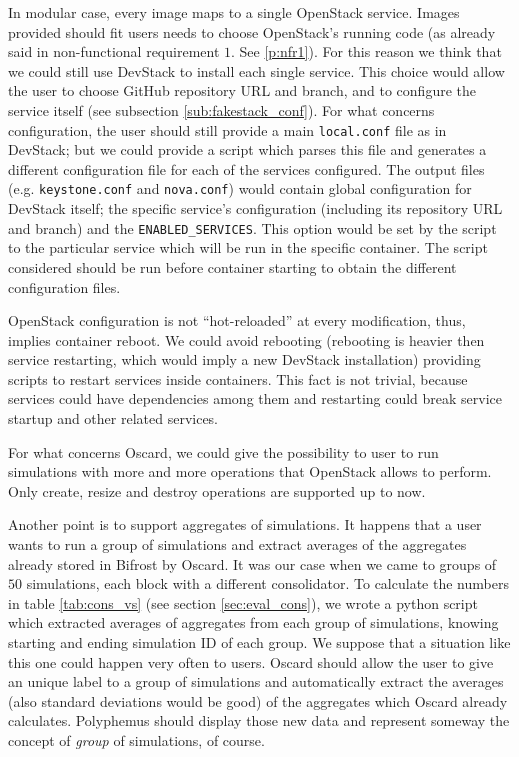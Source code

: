 In modular case, every image maps to a single OpenStack service. Images provided should fit users needs to choose OpenStack's running code (as already said in non-functional requirement $1$. See \ref{p:nfr1}). For this reason we think that we could still use DevStack to install each single service. This choice would allow the user to choose GitHub repository URL and branch, and to configure the service itself (see subsection \ref{sub:fakestack_conf}). For what concerns configuration, the user should still provide a main \texttt{local.conf} file as in DevStack; but we could provide a script which parses this file and generates a different configuration file for each of the services configured. The output files (e.g. \texttt{keystone.conf} and \texttt{nova.conf}) would contain global configuration for DevStack itself; the specific service's configuration (including its repository URL and branch) and the \texttt{ENABLED\_SERVICES}. This option would be set by the script to the particular service which will be run in the specific container. The script considered should be run before container starting to obtain the different configuration files.

OpenStack configuration is not ``hot-reloaded'' at every modification, thus, implies container reboot. We could avoid rebooting (rebooting is heavier then service restarting, which would imply a new DevStack installation) providing scripts to restart services inside containers. This fact is not trivial, because services could have dependencies among them and restarting could break service startup and other related services. 

For what concerns Oscard, we could give the possibility to user to run simulations with more and more operations that OpenStack allows to perform. Only create, resize and destroy operations are supported up to now.

Another point is to support aggregates of simulations. It happens that a user wants to run a group of simulations and extract averages of the aggregates already stored in Bifrost by Oscard. It was our case when we came to groups of $50$ simulations, each block with a different consolidator. To calculate the numbers in table \ref{tab:cons_vs} (see section \ref{sec:eval_cons}), we wrote a python script which extracted averages of aggregates from each group of simulations, knowing starting and ending simulation ID of each group. We suppose that a situation like this one could happen very often to users. Oscard should allow the user to give an unique label to a group of simulations and automatically extract the averages (also standard deviations would be good) of the aggregates which Oscard already calculates. Polyphemus should display those new data and represent someway the concept of \emph{group} of simulations, of course.

